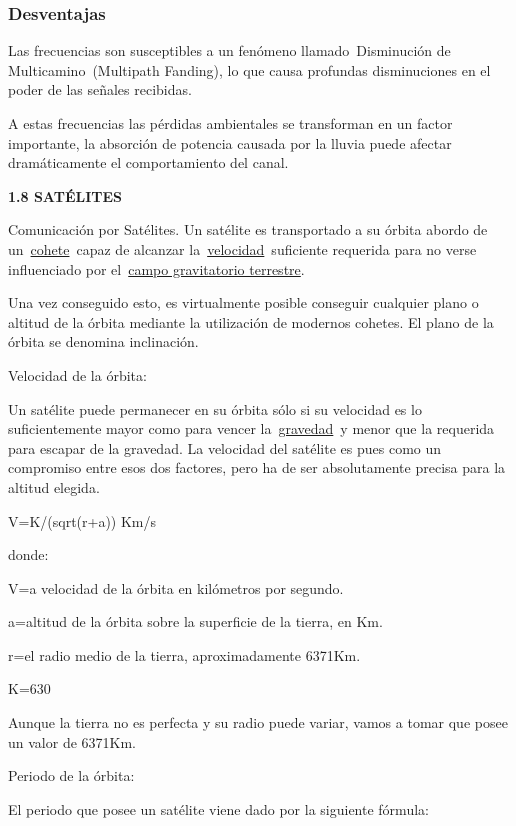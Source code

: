 \subsubsection{Desventajas}\label{desventajas}

Las frecuencias son susceptibles a un fenómeno llamado~Disminución de
Multicamino~(Multipath Fanding), lo que causa profundas disminuciones en
el poder de las señales recibidas.

A estas frecuencias las pérdidas ambientales se transforman en un factor
importante, la absorción de potencia causada por la lluvia puede afectar
dramáticamente el comportamiento del canal.

\textbf{1.8 SATÉLITES }

Comunicación por Satélites. Un satélite es transportado a su órbita
abordo de un~\href{https://www.ecured.cu/Cohete}{cohete}~capaz de
alcanzar la~\href{https://www.ecured.cu/Velocidad}{velocidad}~suficiente
requerida para no verse influenciado por
el~\href{https://www.ecured.cu/index.php?title=Campo_gravitatorio_terrestre\&action=edit\&redlink=1}{campo
gravitatorio terrestre}.

Una vez conseguido esto, es virtualmente posible conseguir cualquier
plano o altitud de la órbita mediante la utilización de modernos
cohetes. El plano de la órbita se denomina inclinación.

Velocidad de la órbita:

Un satélite puede permanecer en su órbita sólo si su velocidad es lo
suficientemente mayor como para vencer
la~\href{https://www.ecured.cu/Gravedad}{gravedad}~y menor que la
requerida para escapar de la gravedad. La velocidad del satélite es pues
como un compromiso entre esos dos factores, pero ha de ser absolutamente
precisa para la altitud elegida.

V=K/(sqrt(r+a)) Km/s

donde:

V=a velocidad de la órbita en kilómetros por segundo.

a=altitud de la órbita sobre la superficie de la tierra, en Km.

r=el radio medio de la tierra, aproximadamente 6371Km.

K=630

Aunque la tierra no es perfecta y su radio puede variar, vamos a tomar
que posee un valor de 6371Km.

Periodo de la órbita:

El periodo que posee un satélite viene dado por la siguiente fórmula:

